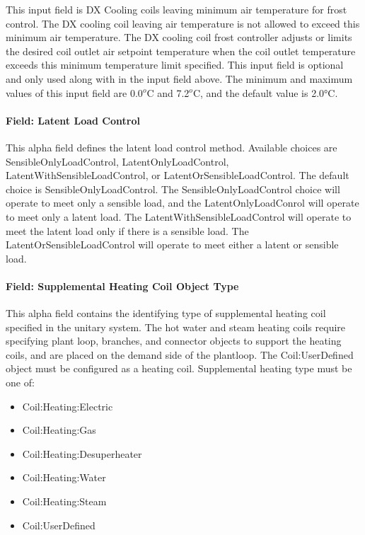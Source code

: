 This input field is DX Cooling coils leaving minimum air temperature for frost control. The DX cooling coil leaving air temperature is not allowed to exceed this minimum air temperature. The DX cooling coil frost controller adjusts or limits the desired coil outlet air setpoint temperature when the coil outlet temperature exceeds this minimum temperature limit specified. This input field is optional and only used along with in the input field above. The minimum and maximum values of this input field are 0.0\(^{o}\)C and 7.2\(^{o}\)C, and the default value is 2.0°C.

\paragraph{Field: Latent Load Control}\label{field-latent-load-control}

This alpha field defines the latent load control method. Available choices are SensibleOnlyLoadControl, LatentOnlyLoadControl, LatentWithSensibleLoadControl, or LatentOrSensibleLoadControl. The default choice is SensibleOnlyLoadControl. The SensibleOnlyLoadControl choice will operate to meet only a sensible load, and the LatentOnlyLoadConrol will operate to meet only a latent load. The LatentWithSensibleLoadControl will operate to meet the latent load only if there is a sensible load. The LatentOrSensibleLoadControl will operate to meet either a latent or sensible load.

\paragraph{Field: Supplemental Heating Coil Object Type}\label{field-supplemental-heating-coil-object-type}

This alpha field contains the identifying type of supplemental heating coil specified in the unitary system. The hot water and steam heating coils require specifying plant loop, branches, and connector objects to support the heating coils, and are placed on the demand side of the plantloop. The Coil:UserDefined object must be configured as a heating coil. Supplemental heating type must be one of:

\begin{itemize}
\item
  Coil:Heating:Electric
\item
  Coil:Heating:Gas
\item
  Coil:Heating:Desuperheater
\item
  Coil:Heating:Water
\item
  Coil:Heating:Steam
\item
  Coil:UserDefined
\end{itemize}

